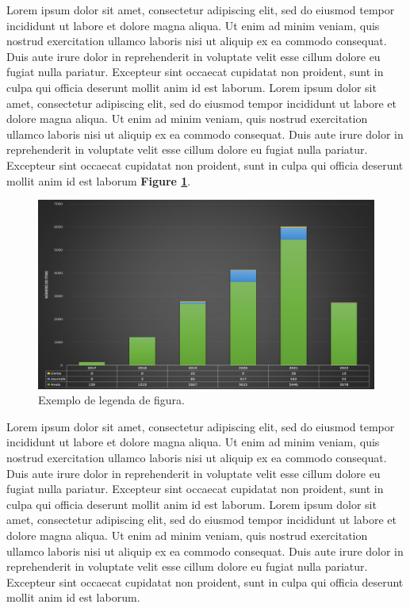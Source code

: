 \documentclass[portuguese]{sbc2025}%
\begin{document}
Lorem ipsum dolor sit amet, consectetur adipiscing elit, sed do eiusmod tempor incididunt ut labore et dolore magna aliqua. Ut enim ad minim veniam, quis nostrud exercitation ullamco laboris nisi ut aliquip ex ea commodo consequat. Duis aute irure dolor in reprehenderit in voluptate velit esse cillum dolore eu fugiat nulla pariatur. Excepteur sint occaecat cupidatat non proident, sunt in culpa qui officia deserunt mollit anim id est laborum. Lorem ipsum dolor sit amet, consectetur adipiscing elit, sed do eiusmod tempor incididunt ut labore et dolore magna aliqua. Ut enim ad minim veniam, quis nostrud exercitation ullamco laboris nisi ut aliquip ex ea commodo consequat. Duis aute irure dolor in reprehenderit in voluptate velit esse cillum dolore eu fugiat nulla pariatur. Excepteur sint occaecat cupidatat non proident, sunt in culpa qui officia deserunt mollit anim id est laborum \textbf{Figure \ref{Fig2}}.

\begin{figure}
\begin{center}
\includegraphics[width=30pc]{sol.jpg}
\caption{{Exemplo de legenda de figura.}}
 \label{Fig2}
\end{center}
\end{figure}

Lorem ipsum dolor sit amet, consectetur adipiscing elit, sed do eiusmod tempor incididunt ut labore et dolore magna aliqua. Ut enim ad minim veniam, quis nostrud exercitation ullamco laboris nisi ut aliquip ex ea commodo consequat. Duis aute irure dolor in reprehenderit in voluptate velit esse cillum dolore eu fugiat nulla pariatur. Excepteur sint occaecat cupidatat non proident, sunt in culpa qui officia deserunt mollit anim id est laborum. Lorem ipsum dolor sit amet, consectetur adipiscing elit, sed do eiusmod tempor incididunt ut labore et dolore magna aliqua. Ut enim ad minim veniam, quis nostrud exercitation ullamco laboris nisi ut aliquip ex ea commodo consequat. Duis aute irure dolor in reprehenderit in voluptate velit esse cillum dolore eu fugiat nulla pariatur. Excepteur sint occaecat cupidatat non proident, sunt in culpa qui officia deserunt mollit anim id est laborum.
\end{document}
